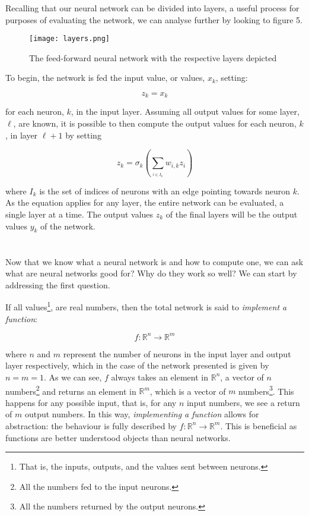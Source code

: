 \documentclass[11pt]{article}
\begin{document}
Recalling that our neural network can be divided into layers, a useful process for purposes of evaluating the network, we can analyse further by looking to figure 5.

\begin{figure}[h]
    \centering
    \texttt{[image: layers.png]}
    \caption{The feed-forward neural network with the respective layers depicted}   
\end{figure}

To begin, the network is fed the input value, or values, $x_{k}$, setting:

\begin{equation}z_{k}=x_{k}\nonumber\end{equation}

for each neuron, $k$, in the input layer. Assuming all output values for some layer, $\ell$, are known, it is possible to then compute the output values for each neuron, $k$, in layer $\ell+1$ by setting

\begin{equation}z_{k} = \sigma_{k}\left(\sum_{_{i\in I_{k}}} w_{i,k}z_{i} \right)\nonumber\end{equation}

where $I_{k}$ is the set of indices of neurons with an edge pointing towards neuron $k$. As the equation applies for any layer, the entire network can be evaluated, a single layer at a time. The output values $z_{k}$ of the final layers will be the output values $y_{k}$ of the network.

\section{}

Now that we know what a neural network is and how to compute one, we can ask what are neural networks good for? Why do they work so well? We can start by addressing the first question.

If all values\footnote{That is, the inputs, outputs, and the values sent between neurons.}, are real numbers, then the total network is said to \textit{implement a function}:

\begin{equation}f: \mathbb{R}^{n} \rightarrow \mathbb{R}^{m}  \nonumber\end{equation}

where $n$ and $m$ represent the number of neurons in the input layer and output layer respectively, which in the case of the network presented is given by $n=m=1$. As we can see, $f$ always takes an element in $\mathbb{R}^{n}$, a vector of $n$ numbers\footnote{All the numbers fed to the input neurons.} and returns an element in  $\mathbb{R}^{m}$, which is a vector of $m$ numbers\footnote{All the numbers returned by the output neurons.}. This happens for any possible input, that is, for any $n$ input numbers, we see a return of $m$ output numbers. In this way, \textit{implementing a function} allows for abstraction: the behaviour is fully described by $f: \mathbb{R}^{n} \rightarrow \mathbb{R}^{m}$. This is beneficial as functions are better understood objects than neural networks.
\end{document}
